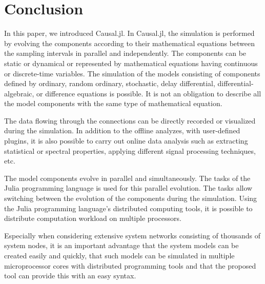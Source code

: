 \section{Conclusion}
In this paper, we introduced Causal.jl. In Causal.jl, the simulation is performed by evolving the components according to their mathematical equations between the sampling intervals in parallel and independently. The components can be static or dynamical or represented by mathematical equations having continuous or discrete-time variables. The simulation of the models consisting of components defined by ordinary, random ordinary, stochastic, delay differential, differential-algebraic, or difference equations is possible. It is not an obligation to describe all the model components with the same type of mathematical equation.

The data flowing through the connections can be directly recorded or visualized during the simulation. In addition to the offline analyzes, with user-defined plugins, it is also possible to carry out online data analysis such as extracting statistical or spectral properties, applying different signal processing techniques, etc. 

The model components evolve in parallel and simultaneously. The tasks of the Julia programming language is used for this parallel evolution. The tasks allow switching between the evolution of the components during the simulation. Using the Julia programming language's distributed computing tools, it is possible to distribute computation workload on multiple processors.

Especially when considering extensive system networks consisting of thousands of system nodes, it is an important advantage that the system models can be created easily and quickly, that such models can be simulated in multiple microprocessor cores with distributed programming tools and that the proposed tool can provide this with an easy syntax.